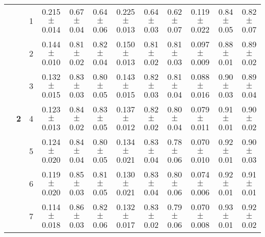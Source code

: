 \begin{table*}
{\begin{tabular}{|l|c|c||c|c|c||c|c|c||c|c|c|}
\cline{2-12}
 & \multirow{8}{*}{\textbf{2}} & 1 & \textcolor{gate_color}{0.215$\pm$0.014} & \textcolor{gate_color}{0.67$\pm$0.04} & \textcolor{gate_color}{0.64$\pm$0.06} & \textcolor{mixed_color}{0.225$\pm$0.013} & \textcolor{mixed_color}{0.64$\pm$0.03} & \textcolor{mixed_color}{0.62$\pm$0.07} & \textcolor{pulsed_color}{0.119$\pm$0.022} & \textcolor{pulsed_color}{0.84$\pm$0.05} & \textcolor{pulsed_color}{0.82$\pm$0.07} \\
 & & 2 & \textcolor{gate_color}{0.144$\pm$0.010} & \textcolor{gate_color}{0.81$\pm$0.02} & \textcolor{gate_color}{0.82$\pm$0.04} & \textcolor{mixed_color}{0.150$\pm$0.013} & \textcolor{mixed_color}{0.81$\pm$0.02} & \textcolor{mixed_color}{0.81$\pm$0.03} & \textcolor{pulsed_color}{0.097$\pm$0.009} & \textcolor{pulsed_color}{0.88$\pm$0.01} & \textcolor{pulsed_color}{0.89$\pm$0.02} \\
 & & 3 & \textcolor{gate_color}{0.132$\pm$0.015} & \textcolor{gate_color}{0.83$\pm$0.03} & \textcolor{gate_color}{0.80$\pm$0.05} & \textcolor{mixed_color}{0.143$\pm$0.015} & \textcolor{mixed_color}{0.82$\pm$0.03} & \textcolor{mixed_color}{0.81$\pm$0.04} & \textcolor{pulsed_color}{0.088$\pm$0.016} & \textcolor{pulsed_color}{0.90$\pm$0.03} & \textcolor{pulsed_color}{0.89$\pm$0.04} \\
 & & 4 & \textcolor{gate_color}{0.123$\pm$0.013} & \textcolor{gate_color}{0.84$\pm$0.02} & \textcolor{gate_color}{0.83$\pm$0.05} & \textcolor{mixed_color}{0.137$\pm$0.012} & \textcolor{mixed_color}{0.82$\pm$0.02} & \textcolor{mixed_color}{0.80$\pm$0.04} & \textcolor{pulsed_color}{0.079$\pm$0.011} & \textcolor{pulsed_color}{0.91$\pm$0.01} & \textcolor{pulsed_color}{0.90$\pm$0.02} \\
 & & 5 & \textcolor{gate_color}{0.124$\pm$0.020} & \textcolor{gate_color}{0.84$\pm$0.04} & \textcolor{gate_color}{0.80$\pm$0.05} & \textcolor{mixed_color}{0.134$\pm$0.021} & \textcolor{mixed_color}{0.83$\pm$0.04} & \textcolor{mixed_color}{0.78$\pm$0.06} & \textcolor{pulsed_color}{0.070$\pm$0.010} & \textcolor{pulsed_color}{0.92$\pm$0.01} & \textcolor{pulsed_color}{0.90$\pm$0.03} \\
 & & 6 & \textcolor{gate_color}{0.119$\pm$0.020} & \textcolor{gate_color}{0.85$\pm$0.03} & \textcolor{gate_color}{0.81$\pm$0.05} & \textcolor{mixed_color}{0.130$\pm$0.021} & \textcolor{mixed_color}{0.83$\pm$0.04} & \textcolor{mixed_color}{0.80$\pm$0.06} & \textcolor{pulsed_color}{0.074$\pm$0.006} & \textcolor{pulsed_color}{0.92$\pm$0.01} & \textcolor{pulsed_color}{0.91$\pm$0.01} \\
 & & 7 & \textcolor{gate_color}{0.114$\pm$0.018} & \textcolor{gate_color}{0.86$\pm$0.03} & \textcolor{gate_color}{0.82$\pm$0.06} & \textcolor{mixed_color}{0.132$\pm$0.017} & \textcolor{mixed_color}{0.83$\pm$0.02} & \textcolor{mixed_color}{0.79$\pm$0.06} & \textcolor{pulsed_color}{0.070$\pm$0.008} & \textcolor{pulsed_color}{0.93$\pm$0.01} & \textcolor{pulsed_color}{0.92$\pm$0.02} \\

\end{tabular}}
\end{table*}

